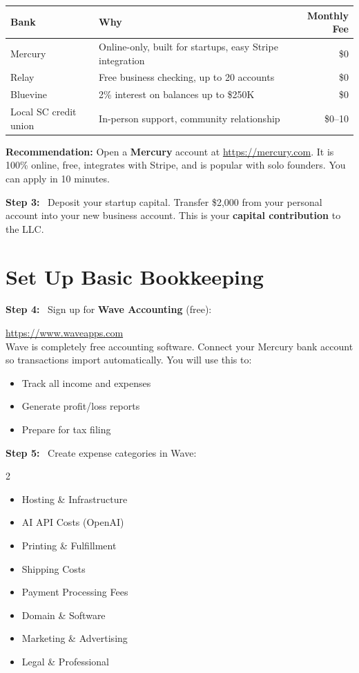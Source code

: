\documentclass[12pt, letterpaper, oneside]{book}
\newcommand{\step}[1]{\noindent\textbf{\textcolor{primary}{Step #1:}}~}
\begin{document}
\begin{table}[H]
\centering
\begin{tabularx}{\textwidth}{lXr}
\toprule
\textbf{Bank} & \textbf{Why} & \textbf{Monthly Fee} \\
\midrule
Mercury & Online-only, built for startups, easy Stripe integration & \$0 \\
Relay & Free business checking, up to 20 accounts & \$0 \\
Bluevine & 2\% interest on balances up to \$250K & \$0 \\
Local SC credit union & In-person support, community relationship & \$0--10 \\
\bottomrule
\end{tabularx}
\end{table}

\begin{infobox}
\textbf{Recommendation:} Open a \textbf{Mercury} account at \url{https://mercury.com}. It is 100\% online, free, integrates with Stripe, and is popular with solo founders. You can apply in 10 minutes.
\end{infobox}

\step{3} Deposit your startup capital. Transfer \$2{,}000 from your personal account into your new business account. This is your \textbf{capital contribution} to the LLC.

\section{Set Up Basic Bookkeeping}

\step{4} Sign up for \textbf{Wave Accounting} (free):
\begin{actionbox}
\url{https://www.waveapps.com}\\[4pt]
Wave is completely free accounting software. Connect your Mercury bank account so transactions import automatically. You will use this to:
\begin{itemize}[leftmargin=1.5em]
  \item Track all income and expenses
  \item Generate profit/loss reports
  \item Prepare for tax filing
\end{itemize}
\end{actionbox}

\step{5} Create expense categories in Wave:
\begin{multicols}{2}
\begin{itemize}[leftmargin=1.5em, itemsep=1pt]
  \item Hosting \& Infrastructure
  \item AI API Costs (OpenAI)
  \item Printing \& Fulfillment
  \item Shipping Costs
  \item Payment Processing Fees
  \item Domain \& Software
  \item Marketing \& Advertising
  \item Legal \& Professional
\end{itemize}
\end{multicols}
\end{document}

